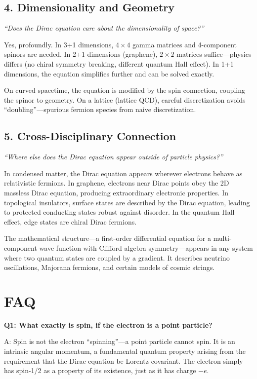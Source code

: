 \documentclass[11pt,openright]{book}
\begin{document}
\subsection*{4. Dimensionality and Geometry}
\textit{``Does the Dirac equation care about the dimensionality of space?''}

Yes, profoundly. In 3+1 dimensions, $4\times 4$ gamma matrices and 4-component spinors are needed. In 2+1 dimensions (graphene), $2\times 2$ matrices suffice---physics differs (no chiral symmetry breaking, different quantum Hall effect). In 1+1 dimensions, the equation simplifies further and can be solved exactly.

On curved spacetime, the equation is modified by the spin connection, coupling the spinor to geometry. On a lattice (lattice QCD), careful discretization avoids ``doubling''---spurious fermion species from naive discretization.

\subsection*{5. Cross-Disciplinary Connection}
\textit{``Where else does the Dirac equation appear outside of particle physics?''}

In condensed matter, the Dirac equation appears wherever electrons behave as relativistic fermions. In graphene, electrons near Dirac points obey the 2D massless Dirac equation, producing extraordinary electronic properties. In topological insulators, surface states are described by the Dirac equation, leading to protected conducting states robust against disorder. In the quantum Hall effect, edge states are chiral Dirac fermions.

The mathematical structure---a first-order differential equation for a multi-component wave function with Clifford algebra symmetry---appears in any system where two quantum states are coupled by a gradient. It describes neutrino oscillations, Majorana fermions, and certain models of cosmic strings.


\section*{FAQ}

\textbf{Q1: What exactly is spin, if the electron is a point particle?}

A: Spin is not the electron ``spinning''---a point particle cannot spin. It is an intrinsic angular momentum, a fundamental quantum property arising from the requirement that the Dirac equation be Lorentz covariant. The electron simply has spin-1/2 as a property of its existence, just as it has charge $-e$.
\end{document}
